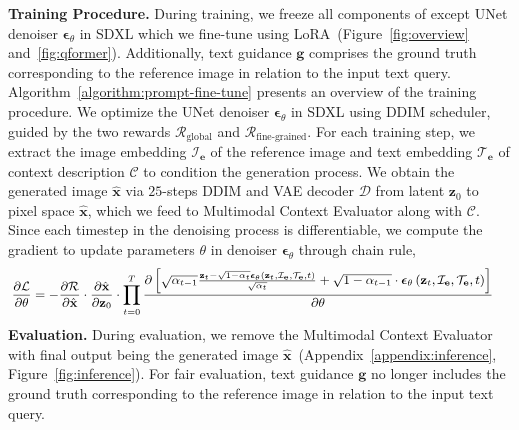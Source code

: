 \setlength{\textfloatsep}{5mm plus 2.0pt minus 2.0pt}
\setlength{\abovecaptionskip}{4mm plus 2.0pt minus 2.0pt}
\textbf{Training Procedure.} During training, we freeze all components of \method except UNet denoiser $\boldsymbol{\epsilon}_\theta$ in SDXL which we fine-tune using LoRA~(Figure~\ref{fig:overview} and~\ref{fig:qformer}).
Additionally, text guidance $\mathbf{g}$ comprises the ground truth corresponding to the reference image in relation to the input text query. Algorithm~\ref{algorithm:prompt-fine-tune} presents an overview of the training procedure. We optimize the UNet denoiser $\boldsymbol{\epsilon}_\theta$ in SDXL using DDIM \citep{song2021score} scheduler, guided by the two rewards $\mathcal{R}_\textrm{global}$ and $\mathcal{R}_{\textrm{fine-grained}}$. For each training step, we extract the image embedding $\mathcal{I}_\mathbf{e}$ of the reference image and text embedding $\mathcal{T}_\mathbf{e}$ of context description $\mathcal{C}$ to condition the generation process. We obtain the generated image $\mathbf{\hat{x}}$ via $25$-steps DDIM and VAE decoder $\mathcal{D}$ from latent $\mathbf{z}_0$ to pixel space $\hat{\mathbf{x}}$, 
which we feed to Multimodal Context Evaluator along with $\mathcal{C}$.
Since each timestep in the denoising process is differentiable, we compute the gradient to update parameters $\theta$ in denoiser $\boldsymbol{\epsilon}_\theta$ through chain rule,
\begin{equation}
\small
\begin{aligned}
&\frac{\partial \mathcal{L}}{\partial \theta}=-\frac{\partial \mathcal{R}}{\partial \hat{\mathbf{x}}} \cdot \frac{\partial \hat{\mathbf{x}}}{\partial \mathbf{z}_0} \cdot \prod_{t=0}^T \frac{\partial\left[\sqrt{\alpha_{t-1}}\frac{\mathbf{z}_t-\sqrt{1-\alpha_t} \boldsymbol{\epsilon}_\theta\left(\mathbf{z}_t, \mathcal{I}_\mathbf{e}, \mathcal{T}_\mathbf{e}, t\right)}{\sqrt{\alpha_t}}+\sqrt{1-\alpha_{t-1}} \cdot \boldsymbol{\epsilon}_\theta\left(\mathbf{z}_t, \mathcal{I}_\mathbf{e}, \mathcal{T}_\mathbf{e}, t\right)\right]}{\partial \theta}
\end{aligned}
\end{equation}
\textbf{Evaluation.} During evaluation, we remove the Multimodal Context Evaluator with final output being the generated image $\mathbf{\hat{x}}$~(Appendix~\ref{appendix:inference}, Figure~\ref{fig:inference}). For fair evaluation, text guidance $\mathbf{g}$ no longer includes the ground truth corresponding to the reference image in relation to the input text query.

